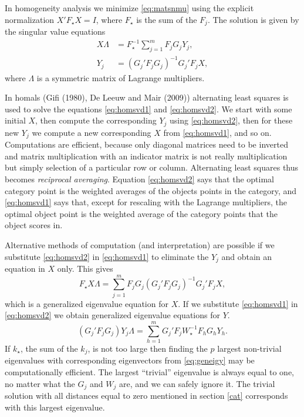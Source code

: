 \documentclass[
  12pt,
]{article}
\begin{document}
In homogeneity analysis we minimize \eqref{eq:matsnmu} using the
explicit normalization \(X'F_\star X=I\), where \(F_\star\) is the
sum of the \(F_j\). The solution is given by the singular value
equations
\begin{subequations}
\begin{align}
X\Lambda&=F_\star^{-1}\sum_{j=1}^m F_jG_jY_j,\label{eq:homsvd1}\\
Y_j&=(G_j'F_jG_j)^{-1}G_j'F_jX,\label{eq:homsvd2}
\end{align}
\end{subequations}
where \(\Lambda\) is a symmetric matrix of Lagrange multipliers.

In homals (Gifi (1980), De Leeuw and Mair (2009)) alternating least squares is used
to solve the equations \eqref{eq:homsvd1} and \eqref{eq:homsvd2}. We start with
some initial \(X\), then compute the corresponding \(Y_j\) using \eqref{eq:homsvd2},
then for these new \(Y_j\) we compute a new corresponding \(X\) from \eqref{eq:homsvd1},
and so on. Computations are efficient, because only diagonal matrices need to
be inverted and matrix multiplication with an indicator matrix is not really multiplication but simply selection of a particular row or column. Alternating least squares thus becomes \emph{reciprocal averaging}. Equation \eqref{eq:homsvd2} says that the optimal category
point is the weighted averages of the objects points in the category, and \eqref{eq:homsvd1}
says that, except for rescaling with the Lagrange multipliers, the optimal object
point is the weighted average of the category points that the object scores in.

Alternative methods of computation (and interpretation) are possible if we
substitute \eqref{eq:homsvd2} in \eqref{eq:homsvd1} to eliminate the \(Y_j\)
and obtain an equation in \(X\) only. This gives
\begin{equation}
F_\star X\Lambda=\sum_{j=1}^m F_jG_j(G_j'F_jG_j)^{-1}G_j'F_jX,
\label{eq:geneigx}
\end{equation}
which is a generalized eigenvalue equation for \(X\). If we substitute \eqref{eq:homsvd1}
in \eqref{eq:homsvd2} we obtain generalized eigenvalue equations for \(Y\).
\begin{equation}
(G_j'F_jG_j)Y_j\Lambda=\sum_{h=1}^m G_j'F_jW_\star^{-1}F_hG_hY_h.
\label{eq:geneigy}
\end{equation}
If \(k_\star\), the sum of the \(k_j\), is not too large then finding the \(p\) largest non-trivial eigenvalues with corresponding eigenvectors from \eqref{eq:geneigy} may be computationally efficient. The largest ``trivial'' eigenvalue is always equal to one, no matter what the \(G_j\) and \(W_j\) are, and we can safely ignore it. The trivial solution with all distances equal to zero mentioned in section \ref{cat} corresponds with this largest eigenvalue.
\end{document}
